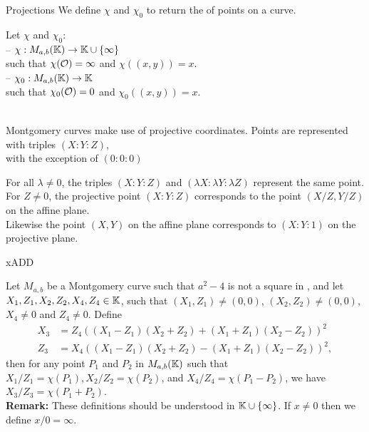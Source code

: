 \documentclass[8pt,aspectratio=169]{beamer}
\begin{document}
%
%
\begin{frame}[fragile]{Projections}
We define $\chi$ and $\chi_0$ to return the \xcoord of points on a curve.
\begin{dfn}Let $\chi$ and $\chi_0$:\\
-- $\chi : M_{a,b}(\mathbb{K}) \to \mathbb{K} \cup \{\infty\}$\\
  such that $\chi(\mathcal{O}) = \infty$ and $\chi((x,y)) = x$.\\
-- $\chi_0 : M_{a,b}(\mathbb{K}) \to \mathbb{K}$\\
  such that $\chi_0(\mathcal{O}) = 0$ and $\chi_0((x,y)) = x$.
\end{dfn}

~\\

Montgomery curves make use of projective coordinates. Points are represented with triples $(X:Y:Z)$,\\
with the exception of $(0:0:0)$

For all $\lambda \neq 0$, the triples $(X:Y:Z)$ and $(\lambda X:\lambda Y:\lambda Z)$ represent the same point.\\
For $Z\neq 0$, the projective point $(X:Y:Z)$ corresponds to the point $(X/Z,Y/Z)$ on the affine plane.\\
Likewise the point $(X,Y)$ on the affine plane corresponds to $(X:Y:1)$ on the projective plane.

\end{frame}


%
%
\begin{frame}{xADD}
  \begin{lemma}
  Let $M_{a,b}$ be a Montgomery curve such that $a^2-4$ is not a square in \K, and
  let $X_1, Z_1, X_2, Z_2, X_4, Z_4 \in \mathbb{K}$, such that $(X_1,Z_1) \neq (0,0)$,
  $(X_2,Z_2) \neq (0,0)$, $X_4 \neq 0$ and $Z_4 \neq 0$.
  Define
  \begin{align*}
  X_3 &= Z_4((X_1 - Z_1)(X_2+Z_2) + (X_1+Z_1)(X_2-Z_2))^2\\
  Z_3 &= X_4((X_1 - Z_1)(X_2+Z_2) - (X_1+Z_1)(X_2-Z_2))^2,
  \end{align*}
  then for any point $P_1$ and $P_2$ in $M_{a,b}(\mathbb{K})$ such that
  $X_1/Z_1 = \chi(P_1), X_2/Z_2 = \chi(P_2)$, and $X_4/Z_4 = \chi(P_1 - P_2)$,
  we have $X_3/Z_3 = \chi(P_1+P_2)$.\\
  \textbf{Remark:}
  These definitions should be understood in $\mathbb{K} \cup \{\infty\}$.
  If $x\ne 0$ then we define $x/0 = \infty$.
  \end{lemma}
\end{frame}
\end{document}
